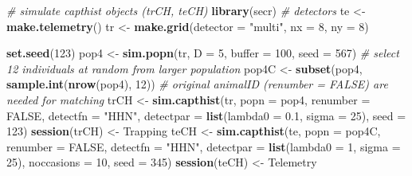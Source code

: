 \documentclass[
]{book}
\newenvironment{Shaded}{\begin{snugshade}}{\end{snugshade}}
\newcommand{\AttributeTok}[1]{\textcolor[rgb]{0.13,0.29,0.53}{#1}}
\newcommand{\CommentTok}[1]{\textcolor[rgb]{0.56,0.35,0.01}{\textit{#1}}}
\newcommand{\ConstantTok}[1]{\textcolor[rgb]{0.56,0.35,0.01}{#1}}
\newcommand{\DecValTok}[1]{\textcolor[rgb]{0.00,0.00,0.81}{#1}}
\newcommand{\FloatTok}[1]{\textcolor[rgb]{0.00,0.00,0.81}{#1}}
\newcommand{\FunctionTok}[1]{\textcolor[rgb]{0.13,0.29,0.53}{\textbf{#1}}}
\newcommand{\NormalTok}[1]{#1}
\newcommand{\OtherTok}[1]{\textcolor[rgb]{0.56,0.35,0.01}{#1}}
\newcommand{\StringTok}[1]{\textcolor[rgb]{0.31,0.60,0.02}{#1}}
\begin{document}
\begin{Shaded}
\begin{Highlighting}[]
\CommentTok{\# simulate capthist objects (trCH, teCH)}
\FunctionTok{library}\NormalTok{(secr)}
\CommentTok{\# detectors}
\NormalTok{te }\OtherTok{\textless{}{-}} \FunctionTok{make.telemetry}\NormalTok{()}
\NormalTok{tr }\OtherTok{\textless{}{-}} \FunctionTok{make.grid}\NormalTok{(}\AttributeTok{detector =} \StringTok{"multi"}\NormalTok{, }\AttributeTok{nx =} \DecValTok{8}\NormalTok{, }\AttributeTok{ny =} \DecValTok{8}\NormalTok{)}

\FunctionTok{set.seed}\NormalTok{(}\DecValTok{123}\NormalTok{)}
\NormalTok{pop4 }\OtherTok{\textless{}{-}} \FunctionTok{sim.popn}\NormalTok{(tr, }\AttributeTok{D =} \DecValTok{5}\NormalTok{, }\AttributeTok{buffer =} \DecValTok{100}\NormalTok{, }\AttributeTok{seed =} \DecValTok{567}\NormalTok{)}
\CommentTok{\# select 12 individuals at random from larger population}
\NormalTok{pop4C }\OtherTok{\textless{}{-}} \FunctionTok{subset}\NormalTok{(pop4, }\FunctionTok{sample.int}\NormalTok{(}\FunctionTok{nrow}\NormalTok{(pop4), }\DecValTok{12}\NormalTok{))}
\CommentTok{\# original animalID (renumber = FALSE) are needed for matching}
\NormalTok{trCH }\OtherTok{\textless{}{-}} \FunctionTok{sim.capthist}\NormalTok{(tr,  }\AttributeTok{popn =}\NormalTok{ pop4, }\AttributeTok{renumber =} \ConstantTok{FALSE}\NormalTok{, }
    \AttributeTok{detectfn =} \StringTok{"HHN"}\NormalTok{, }\AttributeTok{detectpar =} \FunctionTok{list}\NormalTok{(}\AttributeTok{lambda0 =} \FloatTok{0.1}\NormalTok{, }
    \AttributeTok{sigma =} \DecValTok{25}\NormalTok{), }\AttributeTok{seed =} \DecValTok{123}\NormalTok{)}
\FunctionTok{session}\NormalTok{(trCH) }\OtherTok{\textless{}{-}} \StringTok{\textquotesingle{}Trapping\textquotesingle{}}
\NormalTok{teCH }\OtherTok{\textless{}{-}} \FunctionTok{sim.capthist}\NormalTok{(te, }\AttributeTok{popn =}\NormalTok{ pop4C, }\AttributeTok{renumber =} \ConstantTok{FALSE}\NormalTok{, }
    \AttributeTok{detectfn =} \StringTok{"HHN"}\NormalTok{, }\AttributeTok{detectpar =} \FunctionTok{list}\NormalTok{(}\AttributeTok{lambda0 =} \DecValTok{1}\NormalTok{, }\AttributeTok{sigma =} \DecValTok{25}\NormalTok{),}
    \AttributeTok{noccasions =} \DecValTok{10}\NormalTok{, }\AttributeTok{seed =} \DecValTok{345}\NormalTok{)}
\FunctionTok{session}\NormalTok{(teCH) }\OtherTok{\textless{}{-}} \StringTok{\textquotesingle{}Telemetry\textquotesingle{}}
\end{Highlighting}
\end{Shaded}
\end{document}
